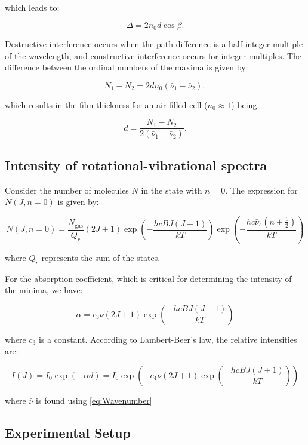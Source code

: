 \documentclass{article}
\begin{document}
which leads to:

\[
\Delta = 2n_0 d \cos \beta.
\]

Destructive interference occurs when the path difference is a half-integer multiple of the wavelength, and constructive interference occurs for integer multiples. The difference between the ordinal numbers of the maxima is given by:

\[
N_1 - N_2 = 2dn_0 (\bar{\nu}_1 - \bar{\nu}_2),
\]

which results in the film thickness for an air-filled cell (\(n_0 \approx 1\)) being

\begin{equation}
	d = \frac{N_1 - N_2}{2(\bar{\nu}_1 - \bar{\nu}_2)}.
	\label{eq:thickness}
\end{equation}

\pagebreak{}

\subsection{Intensity of rotational-vibrational spectra}

Consider the number of molecules \( N \) in the state with \( n = 0 \). The expression for \( N(J, n = 0) \) is given by:

\[
N(J, n = 0) = \frac{N_{\text{gas}}}{Q_r}(2J + 1) \exp \left( - \frac{hcBJ(J+1)}{kT} \right) \exp \left( - \frac{hc \bar{\nu}_s (n + \frac{1}{2})}{kT} \right) 
\]

where \( Q_r \) represents the sum of the states. 

For the absorption coefficient, which is critical for determining the intensity of the minima, we have:

\[
\alpha = c_3 \bar{\nu} (2J + 1) \exp \left( - \frac{hcB J (J + 1)}{kT} \right)
\]

where \( c_3 \) is a constant. According to Lambert-Beer's law, the relative intensities are:

\[
I(J) = I_0 \exp \left( -\alpha d \right) = I_0 \exp \left( -c_4 \bar{\nu} (2J + 1) \exp \left( - \frac{hcB J (J + 1)}{kT} \right) \right)
\]

where \( \bar{\nu} \) is found using \ref{eq:Wavenumber}

\pagebreak{}

\subsection{Experimental Setup}
\end{document}
